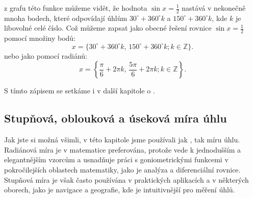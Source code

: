 \documentclass[12pt,a4paper]{article}
\begin{document}
\begin{center}

\end{center}

z grafu této funkce můžeme vidět, že hodnota $\sin x = \frac{1}{2}$ nastává v nekonečně mnoha bodech,
které odpovídají úhlům $30^\circ + 360^\circ k$ a $150^\circ + 360^\circ k$, kde $k$ je libovolné celé číslo. 
Což můžeme zapsat jako obecné řešení rovnice $\sin x = \frac{1}{2}$ pomocí množiny bodů:
\[
x = \{30^\circ + 360^\circ k,\, 150^\circ + 360^\circ k ; k \in \mathbb{Z} \}.
\]
nebo jako pomocí radiánů:
\[
x = \left\{\frac{\pi}{6} + 2\pi k,\, \frac{5\pi}{6} + 2\pi k ; k \in \mathbb{Z} \right\}.
\]

S tímto zápisem se setkáme i v další kapitole o .


\subsection{Stupňová, oblouková a úseková míra úhlu}
Jak jste si možná všimli, v této kapitole jsme používali jak , tak  míru úhlu.
Radiánová míra je v matematice preferována, protože vede k jednodušším a elegantnějším vzorcům
a usnadňuje práci s goniometrickými funkcemi v pokročilejších oblastech matematiky, jako je analýza
a diferenciální rovnice. Stupňová míra je však často používána v praktických aplikacích a v některých oborech,
jako je navigace a geografie, kde je intuitivnější pro měření úhlů.
\end{document}
